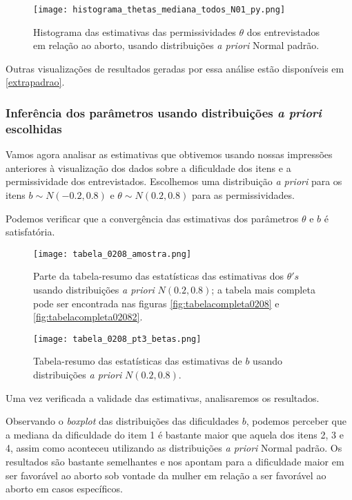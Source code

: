\documentclass[
	12pt,				%
	openright,			%
	twoside,			%
	a4paper,			%
	english,			%
	brazil				%
	]{abntex2}
\begin{document}
 \begin{figure}[!htbp]
    \centering
    \texttt{[image: histograma\_thetas\_mediana\_todos\_N01\_py.png]}
    \caption{Histograma das estimativas das permissividades $\theta$ dos entrevistados em relação ao aborto, usando distribuições \textit{a priori} Normal padrão.}
    \label{fig:thetas01}
 \end{figure}
 
 Outras visualizações de resultados geradas por essa análise estão disponíveis em \ref{extrapadrao}.
 
 \subsubsection*{Inferência dos parâmetros usando distribuições \emph{a priori} escolhidas}
 Vamos agora analisar as estimativas que obtivemos usando nossas impressões anteriores à visualização dos dados sobre a dificuldade dos itens e a permissividade dos entrevistados. Escolhemos uma distribuição \textit{a priori} para os itens $b \sim N(-0.2, 0.8)$ e $\theta \sim N(0.2, 0.8)$ para as permissividades.

 Podemos verificar que a convergência das estimativas dos parâmetros $\theta$ e $b$ é satisfatória.
 
 \begin{figure}[!htbp]
    \centering
    \texttt{[image: tabela\_0208\_amostra.png]}
    \caption{Parte da tabela-resumo das estatísticas das estimativas dos $\theta's$ usando distribuições \textit{a priori} $N(0.2, 0.8)$; a tabela mais completa pode ser encontrada nas figuras \ref{fig:tabelacompleta0208} e \ref{fig:tabelacompleta02082}.}
    \label{fig:tabela0208}
 \end{figure}
 
 \begin{figure}[!htbp]
    \centering
    \texttt{[image: tabela\_0208\_pt3\_betas.png]}
    \caption{Tabela-resumo das estatísticas das estimativas de $b$ usando distribuições \textit{a priori} $N(0.2, 0.8)$.}
    \label{fig:tabela0208beta}
 \end{figure}
 
 Uma vez verificada a validade das estimativas, analisaremos os resultados.
 
 Observando o \textit{boxplot} das distribuições das dificuldades $b$, podemos perceber que a mediana da dificuldade do item 1 é bastante maior que aquela dos itens 2, 3 e 4, assim como aconteceu utilizando as distribuições \textit{a priori} Normal padrão. Os resultados são bastante semelhantes e nos apontam para a dificuldade maior em ser favorável ao aborto sob vontade da mulher em relação a ser favorável ao aborto em casos específicos.
 
\end{document}
